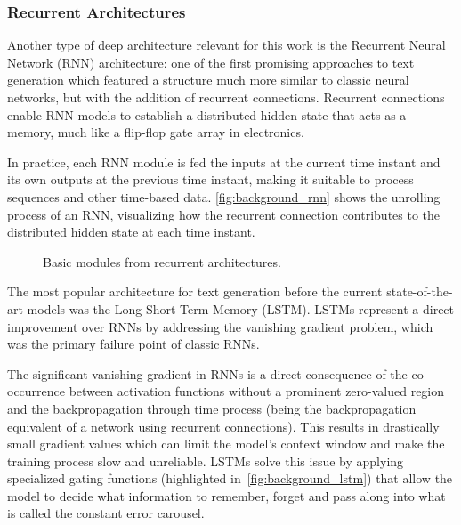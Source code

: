 \subsubsection*{Recurrent Architectures}

Another type of deep architecture relevant for this work is the Recurrent Neural Network (RNN) architecture: one of the first promising approaches to text generation which featured a structure much more similar to classic neural networks, but with the addition of recurrent connections.
Recurrent connections enable RNN models to establish a distributed hidden state that acts as a memory, much like a flip-flop gate array in electronics.

In practice, each RNN module is fed the inputs at the current time instant and its own outputs at the previous time instant, making it suitable to process sequences and other time-based data.
\cref{fig:background_rnn} shows the unrolling process of an RNN, visualizing how the recurrent connection contributes to the distributed hidden state at each time instant.

\begin{figure}[t!]
    \centering
    \quad
    \caption{Basic modules from recurrent architectures.}
    \label{fig:background_rnn_lstm}
\end{figure}

The most popular architecture for text generation before the current state-of-the-art models was the Long Short-Term Memory (LSTM).
LSTMs represent a direct improvement over RNNs by addressing the vanishing gradient problem, which was the primary failure point of classic RNNs.

The significant vanishing gradient in RNNs is a direct consequence of the co-occurrence between activation functions without a prominent zero-valued region and the backpropagation through time process (being the backpropagation equivalent of a network using recurrent connections).
This results in drastically small gradient values which can limit the model's context window and make the training process slow and unreliable.
LSTMs solve this issue by applying specialized gating functions (highlighted in~\cref{fig:background_lstm}) that allow the model to decide what information to remember, forget and pass along into what is called the constant error carousel.

